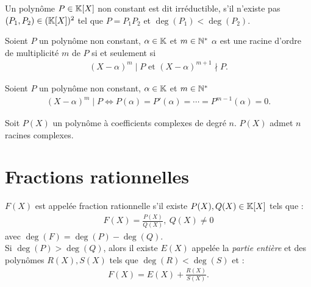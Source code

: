 \begin{definition}
	Un polynôme $P \in \mathbb{K}[X]$ non constant est dit irréductible, s'il n'existe pas $(P_1, P_2) \in (\mathbb{K}[X])^2$ tel que $P = P_1 P_2$ et $\operatorname{deg}(P_1) < \operatorname{deg}(P_2)$.
\end{definition}

\begin{definition}\label{def:ordre_mult}
	Soient $P$ un polynôme non constant, $\alpha \in \mathbb{K}$ et $m \in \mathbb{N}^*$ $\alpha$ est une racine d'ordre de multiplicité $m$ de $P$ si et seulement si
	\begin{align*}
		(X - \alpha)^m \mid P \text{ et } (X - \alpha)^{m+1} \nmid P.
	\end{align*}
\end{definition}

\begin{theorem}
	Soient $P$ un polynôme non constant, $\alpha \in \mathbb{K}$ et $m \in \mathbb{N}^*$
	\begin{align*}
		(X - \alpha)^m \mid P \iff P(\alpha) = P'(\alpha) = \cdots = P^{m-1}(\alpha) = 0.
	\end{align*}
\end{theorem}

\begin{theorem}
	Soit $P(X)$ un polynôme à coefficients complexes de degré $n$. $P(X)$ admet $n$ racines complexes. 
\end{theorem}

\section{Fractions rationnelles}
\begin{definition}
	$F(X)$ est appelée fraction rationnelle s'il existe $P(X), Q(X) \in \mathbb{K}[X]$ tels que :
	\begin{align*}
		F(X) = \frac{P(X)}{Q(X)},\ Q(X) \neq 0
	\end{align*}
	avec $\deg(F) = \deg(P) - \deg(Q)$. \\
	Si $\deg(P) > \deg(Q)$, alors il existe $E(X)$ appelée la \emph{partie entière} et des polynômes $R(X), S(X)$ tels que $\deg(R) < \deg(S)$ et : 
	\begin{align*}
		F(X) = E(X) + \frac{R(X)}{S(X)}.
	\end{align*}
\end{definition}

